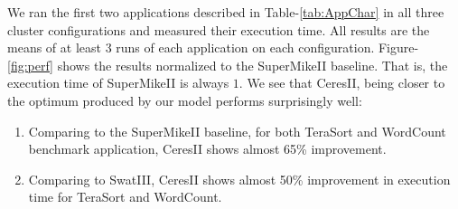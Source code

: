 \documentclass[journal]{IEEEtran}
\begin{document}
We ran the first two applications described in Table-\ref{tab:AppChar} in all three cluster configurations and measured their execution time. All results are the means of at least 3 runs of each application on each configuration. Figure-\ref{fig:perf} shows the results normalized to the SuperMikeII baseline. That is, the  execution time of SuperMikeII is always $1$. We see that CeresII, being closer to the optimum produced by our model performs surprisingly well: 
\begin{enumerate}
\item Comparing to the SuperMikeII baseline, for both TeraSort and WordCount benchmark application, CeresII shows almost 65\% improvement. 
\item Comparing to SwatIII, CeresII shows almost 50\% improvement in execution time for TeraSort and WordCount. 
\end{enumerate}
\end{document}
